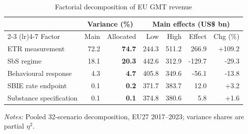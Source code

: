 \begin{table}[H]
\centering
\footnotesize
\setlength{\tabcolsep}{3pt}
\caption[Factorial decomposition of EU GMT revenue]{Factorial decomposition of EU GMT revenue}
\label{tab:stage4_6_factor_decomposition}
\label{tab:stage4_6_shapley_attribution}
\label{tab:stage4_6_main_effects}
\begin{tabular}{@{}l rr rrr r@{}}
\toprule
 & \multicolumn{2}{c}{Variance (\%)} & \multicolumn{4}{c}{Main effects (US\$ bn)} \\
\cmidrule(lr){2-3} \cmidrule(lr){4-7}
Factor & Main & Allocated & Low & High & Effect & Chg (\%) \\
\midrule
ETR measurement & 72.2 & \textbf{74.7} & 244.3 & 511.2 & 266.9 & +109.2 \\
SbS regime & 18.1 & \textbf{20.3} & 442.6 & 312.9 & -129.7 & -29.3 \\
Behavioural response & 4.3 & \textbf{4.7} & 405.8 & 349.6 & -56.1 & -13.8 \\
SBIE rate endpoint & 0.1 & \textbf{0.2} & 371.7 & 383.7 & 12.0 & +3.2 \\
Substance specification & 0.1 & \textbf{0.1} & 374.8 & 380.6 & 5.8 & +1.6 \\
\bottomrule
\end{tabular}

\vspace{0.35em}
\noindent\begin{minipage}{\textwidth}
\footnotesize\raggedright\textit{Notes:} Pooled 32-scenario decomposition, EU27 2017--2023; variance shares are partial $\eta^{2}$.
\end{minipage}
\end{table}
